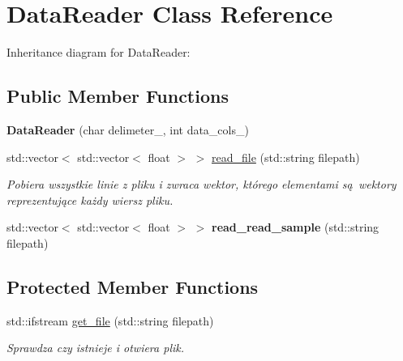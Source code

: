 \hypertarget{classDataReader}{}\section{Data\+Reader Class Reference}
\label{classDataReader}


Inheritance diagram for Data\+Reader\+:
\subsection*{Public Member Functions}
\begin{DoxyCompactItemize}
\item 
\mbox{\label{classDataReader_a64029958665c3e72624d2c90439d297b}} 
{\bfseries Data\+Reader} (char delimeter\+\_\+, int data\+\_\+cols\+\_\+)
\item 
\mbox{\label{classDataReader_aa319d0b428916f90ab04264db7228085}} 
std\+::vector$<$ std\+::vector$<$ float $>$ $>$ \hyperlink{classDataReader_aa319d0b428916f90ab04264db7228085}{read\+\_\+file} (std\+::string filepath)
\begin{DoxyCompactList}\small\item\em Pobiera wszystkie linie z pliku i zwraca wektor, którego elementami są wektory reprezentujące każdy wiersz pliku. \end{DoxyCompactList}\item 
\mbox{\label{classDataReader_ae7069e89867633c00f585334846c6002}} 
std\+::vector$<$ std\+::vector$<$ float $>$ $>$ {\bfseries read\+\_\+read\+\_\+sample} (std\+::string filepath)
\end{DoxyCompactItemize}
\subsection*{Protected Member Functions}
\begin{DoxyCompactItemize}
\item 
\mbox{\label{classDataReader_a0e9af765fe3e2ed0f721b626fcf4d1d7}} 
std\+::ifstream \hyperlink{classDataReader_a0e9af765fe3e2ed0f721b626fcf4d1d7}{get\+\_\+file} (std\+::string filepath)
\begin{DoxyCompactList}\small\item\em Sprawdza czy istnieje i otwiera plik. \end{DoxyCompactList}\end{DoxyCompactItemize}
